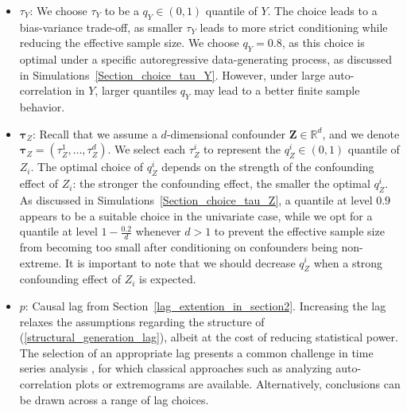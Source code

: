 \documentclass[a4paper,11pt]{article}
\begin{document}
\begin{itemize}
\(
    \widetilde S_1
    :=
    \left\{
    t\in\{1,\dots,n\}:
    \begin{pmatrix}
        Y_t\\
        \mathbf Z_t
    \end{pmatrix}
    \leq \boldsymbol{\tau}
    \right\}
\).  If the presence of a strong hidden confounder is suspected, $k_n = n^{\frac{1}{2}}$ appears to be a reasonable choice, as in \cite{bodik}. If one does not suspect strong hidden confounding $k_n=n^{\frac{1}{3}}$ yields better results. This is concluded from the simulations in Section~\ref{Section_choice_k_n}. 
    \item $\tau_Y$: We choose $\tau_Y$ to be a $q_Y\in (0,1)$ quantile of $Y$. The choice  leads to a bias-variance trade-off, as smaller  $\tau_Y$ leads to more strict conditioning while reducing the effective sample size. We choose $q_Y=0.8$, as this choice is optimal under a specific autoregressive data-generating process, as discussed in Simulations~\ref{Section_choice_tau_Y}. However, under large auto-correlation in $Y$, larger quantiles $q_Y$ may lead to a better finite sample behavior. 
    \item $\boldsymbol{\tau}_Z$: Recall that we assume a $d$-dimensional confounder $\textbf{Z}\in\mathbb{R}^d$, and we denote $\boldsymbol{\tau}_Z = (\tau_Z^1, \dots, \tau^d_Z)$. We select each $\tau_Z^i$ to represent the $q_Z^i\in (0,1)$ quantile of $Z_i$. The optimal choice of $q^i_Z$ depends on the strength of the confounding effect of $Z_i$: the stronger the confounding effect, the smaller the optimal $q^i_Z$. As discussed in Simulations~\ref{Section_choice_tau_Z}, a quantile at level $0.9$ appears to be a suitable choice in the univariate case, while we opt for a quantile at level $1- \frac{0.2}{d}$ whenever $d>1$ to prevent the effective sample size from becoming too small after conditioning on confounders being non-extreme. It is important to note that we should decrease $q^i_Z$ when a strong confounding effect of $Z_i$ is expected. 
    \item $p$: Causal lag from Section~\ref{lag_extention_in_section2}. Increasing the lag relaxes the assumptions regarding the structure of (\ref{structural_generation_lag}), albeit at the cost of reducing statistical power. 
    The selection of an appropriate lag presents a common challenge in time series analysis \citep{LagSelection,Runge2019PCMCI}, for which classical approaches such as analyzing auto-correlation plots or extremograms \citep{Extremogram} are available. Alternatively, conclusions can be drawn across a range of lag choices.
\end{itemize}
\end{document}
